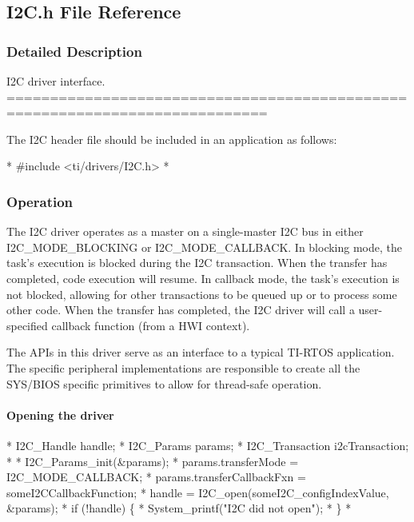 \subsection{I2\-C.\-h File Reference}
\label{_i2_c_8h}


\subsubsection{Detailed Description}
I2\-C driver interface. ============================================================================

The I2\-C header file should be included in an application as follows\-: 
\begin{DoxyCode}
*  #include <ti/drivers/I2C.h>
*  
\end{DoxyCode}


\subsubsection*{Operation}

The I2\-C driver operates as a master on a single-\/master I2\-C bus in either I2\-C\-\_\-\-M\-O\-D\-E\-\_\-\-B\-L\-O\-C\-K\-I\-N\-G or I2\-C\-\_\-\-M\-O\-D\-E\-\_\-\-C\-A\-L\-L\-B\-A\-C\-K. In blocking mode, the task's execution is blocked during the I2\-C transaction. When the transfer has completed, code execution will resume. In callback mode, the task's execution is not blocked, allowing for other transactions to be queued up or to process some other code. When the transfer has completed, the I2\-C driver will call a user-\/specified callback function (from a H\-W\-I context).

The A\-P\-Is in this driver serve as an interface to a typical T\-I-\/\-R\-T\-O\-S application. The specific peripheral implementations are responsible to create all the S\-Y\-S/\-B\-I\-O\-S specific primitives to allow for thread-\/safe operation.

\paragraph*{Opening the driver}


\begin{DoxyCode}
*  I2C_Handle      handle;
*  I2C_Params      params;
*  I2C_Transaction i2cTransaction;
*
*  I2C_Params_init(&params);
*  params.transferMode  = I2C_MODE_CALLBACK;
*  params.transferCallbackFxn = someI2CCallbackFunction;
*  handle = I2C_open(someI2C\_configIndexValue, &params);
*  \textcolor{keywordflow}{if} (!handle) \{
*      System\_printf(\textcolor{stringliteral}{"I2C did not open"});
*  \}
*  
\end{DoxyCode}


